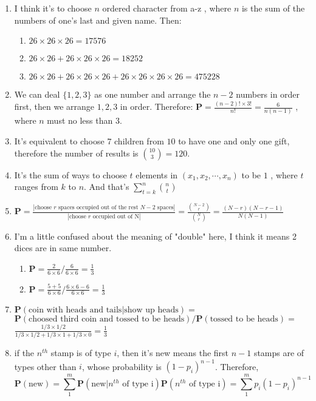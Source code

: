 \documentclass[12pt]{article}
\begin{document}
\begin{enumerate}
\begin{enumerate}
    \end{enumerate}
    \item I think it's to choose $n$ ordered character from a-z , where $n$ is the sum of the numbers of one's last and given name. Then:
    \begin{enumerate}
        \item $26 \times 26 \times 26 = 17576$
        \item $26 \times 26 + 26 \times 26 \times 26 = 18252$
        \item $26 \times 26 + 26 \times 26 \times 26 + 26 \times 26 \times 26 \times 26 = 475228$
    \end{enumerate}
    \item 
    We can deal $\{1,2,3\}$ as one number and arrange the $n-2$ numbers in order first, then we arrange ${1,2,3}$ in order. Therefore:
    $\textbf{P} = \frac{ ( n - 2 ) ! \times 3 ! }{ n ! } = \frac{6}{n ( n - 1 )}$ , where $n$ must no less than $3$. 
    \item 
    It's equivalent to choose $7$ children from $10$ to have one and only one gift, therefore the number of results is $\binom{10}{3} = 120$.
    \item 
    It's the sum of ways to choose $t$ elements in $(x_1,x_2,\cdots,x_n)$ to be $1$ , where $t$ ranges from $k$ to $n$. And that's $\sum_{t=k}^{n} \binom{n}{t}$
    \item 
    $\textbf{P} = \frac{|\text{choose $r$ spaces occupied out of the rest $N-2$ spaces}|}{|\text{choose $r$ occupied out of N}|} = \frac{\binom{N - 2}{r}}{\binom{N}{r}} = \frac{(N - r) (N - r - 1)}{N (N - 1)}$
    \item I'm a little confused about the meaning of "double" here, I think it means 2 dices are in same number.
    \begin{enumerate}
        \item $\textbf{P} = \frac{2}{6 \times 6} / \frac{6}{6 \times 6} = \frac{1}{3}$
        \item $\textbf{P} = \frac{5 + 5}{6 \times 6} / \frac{6 \times 6 - 6}{6 \times 6} = \frac{1}{3}$
    \end{enumerate}
    \item 
    $\textbf{P}(\text{coin with heads and tails} | \text{show up heads}) = $\\
    $\textbf{P}(\text{choosed third coin and tossed to be heads}) / \textbf{P}(\text{tossed to be heads}) = $\\
    $\frac{1/3 \times 1/2}{1/3 \times 1/2 + 1/3 \times 1 + 1/3 \times 0} = \frac{1}{3}$
    \item 
    if the $n^{th}$ stamp is of type $i$, then it's new means the first $n - 1$ stamps are of types other than $i$, whose probability is $(1 - p_i)^{n-1}$. Therefore, 
    $$\textbf{P}(\text{new}) = \sum_1^m \textbf{P}(\text{new} | \text{$n^{th}$ of type i}) \textbf{P}(\text{$n^{th}$ of type i}) = \sum_1^m p_i (1-p_i)^{n-1}$$
\end{enumerate}
\end{document}
